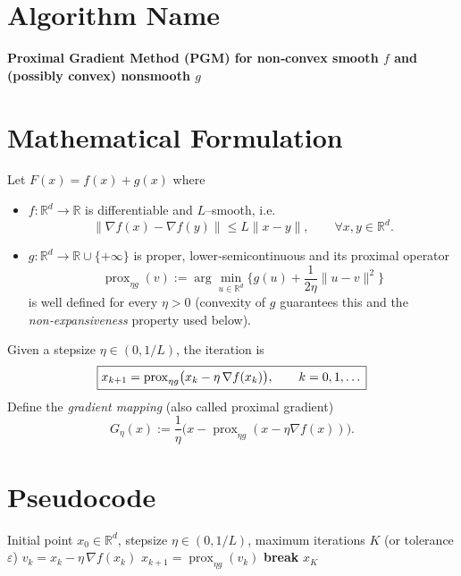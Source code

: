 \documentclass{article}
\newcommand{\prox}{\operatorname{prox}}
\newcommand{\grad}{\nabla}
\newcommand{\R}{\mathbb{R}}
\begin{document}
\section*{Algorithm Name}
\textbf{Proximal Gradient Method (PGM) for non‑convex smooth $f$ and (possibly convex) nonsmooth $g$}

\section*{Mathematical Formulation}
Let $F(x)=f(x)+g(x)$ where  

\begin{itemize}[noitemsep,leftmargin=*]
\item $f:\R^{d}\rightarrow\R$ is differentiable and $L$–smooth, i.e. 
\[
\|\grad f(x)-\grad f(y)\|\le L\|x-y\|,\qquad\forall x,y\in\R^{d}.
\]
\item $g:\R^{d}\rightarrow\R\cup\{+\infty\}$ is proper, lower‑semicontinuous and its proximal operator
\[
\prox_{\eta g}(v):=\arg\min_{u\in\R^{d}}\Big\{g(u)+\frac{1}{2\eta}\|u-v\|^{2}\Big\}
\]
is well defined for every $\eta>0$ (convexity of $g$ guarantees this and the \emph{non‑expansiveness} property used below).
\end{itemize}

Given a stepsize $\eta\in(0,1/L)$, the iteration is
\begin{equation}
\boxed{%
x_{k+1}= \prox_{\eta g}\bigl(x_{k}-\eta\,\grad f(x_{k})\bigr),\qquad k=0,1,\dots
}
\label{eq:update}
\end{equation}
Define the \emph{gradient mapping} (also called proximal gradient) 
\[
G_{\eta}(x):=\frac{1}{\eta}\bigl(x-\prox_{\eta g}(x-\eta\grad f(x))\bigr).
\tag{1}
\]

\section*{Pseudocode}
\begin{algorithm}[H]
\caption{Proximal Gradient Method}
\begin{algorithmic}[1]
\REQUIRE Initial point $x_{0}\in\R^{d}$, stepsize $\eta\in(0,1/L)$, maximum iterations $K$ (or tolerance $\varepsilon$)
    \STATE $v_{k}=x_{k}-\eta\,\grad f(x_{k})$ \hfill{}
    \STATE $x_{k+1}= \prox_{\eta g}(v_{k})$ \hfill{}
        \STATE \textbf{break}
    \ENDIF
\ENDFOR
\RETURN $x_{K}$
\end{algorithmic}
\end{algorithm}
\end{document}
